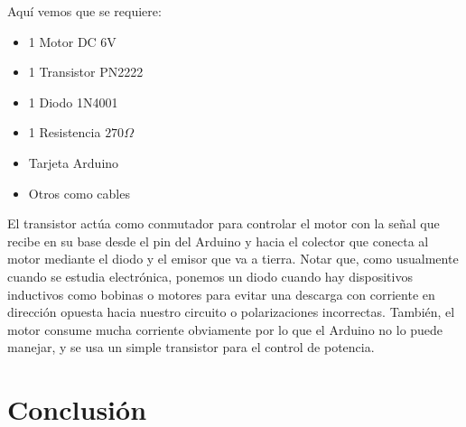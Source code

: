 \documentclass[conference]{IEEEtran}
\begin{document}
Aquí vemos que se requiere:

\begin{itemize}
\item 1 Motor DC 6V
\item 1 Transistor PN2222
\item 1 Diodo 1N4001
\item 1 Resistencia $270 \Omega$
\item Tarjeta Arduino
\item Otros como cables
\end{itemize}

\bigbreak

El transistor actúa como conmutador para controlar el motor con la señal que recibe en su base desde el pin del Arduino y hacia el colector que conecta al motor mediante el diodo y el emisor que va a tierra. Notar que, como usualmente cuando se estudia electrónica, ponemos un diodo cuando hay dispositivos inductivos como bobinas o motores para evitar una descarga con corriente en dirección opuesta hacia nuestro circuito o polarizaciones incorrectas. También, el motor consume mucha corriente obviamente por lo que el Arduino no lo puede manejar, y se usa un simple transistor para el control de potencia.

\section{Conclusión}


\printbibliography
\end{document}
